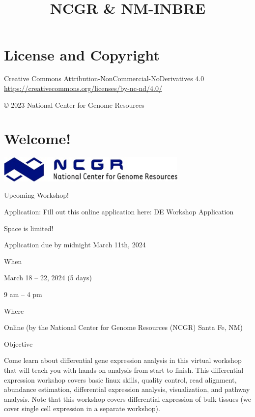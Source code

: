 \documentclass[
]{book}
\title{NCGR \& NM-INBRE}
\author{}
\date{\vspace{-2.5em}}
\begin{document}
\maketitle

{
\setcounter{tocdepth}{1}
\tableofcontents
}
\hypertarget{license-and-copyright}{%
\chapter*{License and Copyright}\label{license-and-copyright}}

Creative Commons Attribution-NonCommercial-NoDerivatives 4.0
\url{https://creativecommons.org/licenses/by-nc-nd/4.0/}

© 2023 National Center for Genome Resources

\hypertarget{welcome}{%
\chapter{Welcome!}\label{welcome}}

\includegraphics[width=0.7\textwidth,height=\textheight]{./Figures/ncgr.png}

Upcoming Workshop!

Application: Fill out this online application here: DE Workshop Application

Space is limited!

Application due by midnight March 11th, 2024

\hspace{0pt}

When

March 18 -- 22, 2024 (5 days)

9 am -- 4 pm

\hspace{0pt}

Where

Online (by the National Center for Genome Resources (NCGR) Santa Fe, NM)

Objective

Come learn about differential gene expression analysis in this virtual workshop that will teach you with hands-on analysis from start to finish. This differential expression workshop covers basic linux skills, quality control, read alignment, abundance estimation, differential expression analysis, visualization, and pathway analysis. Note that this workshop covers differential expression of bulk tissues (we cover single cell expression in a separate workshop).
\end{document}
